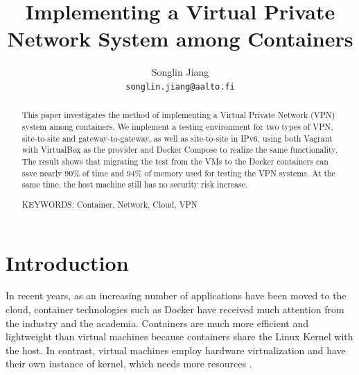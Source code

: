 \documentclass[article]{aaltoseries}
\begin{document}
 

\title{Implementing a Virtual Private Network System among Containers}

\author{Songlin Jiang%
\\\textnormal{\texttt{songlin.jiang@aalto.fi}}} %


\maketitle


\begin{abstract}
This paper investigates the method of implementing a Virtual Private Network (VPN) system among containers. We implement a testing environment for two types of VPN, site-to-site and gateway-to-gateway, as well as site-to-site in IPv6, using both Vagrant with VirtualBox as the provider and Docker Compose to realize the same functionality. The result shows that migrating the test from the VMs to the Docker containers can save nearly 90\% of time and 94\% of memory used for testing the VPN systems. At the same time, the host machine still has no security risk increase.

\vspace{3mm}
\noindent KEYWORDS: Container, Network, Cloud, VPN

\end{abstract}




\section{Introduction}

In recent years, as an increasing number of applications have been moved to the cloud, container technologies such as Docker have received much attention from the industry and the academia. Containers are much more efficient and lightweight than virtual machines because containers share the Linux Kernel with the host. In contrast, virtual machines employ hardware virtualization and have their own instance of kernel, which needs more resources \cite{10.1145/2988336.2988337}.
\end{document}
